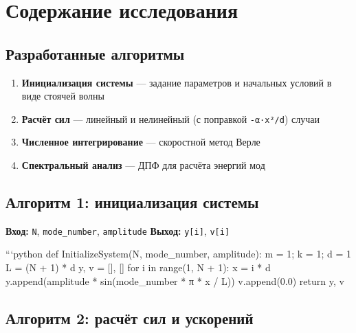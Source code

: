 \documentclass[
  12pt,
  a4paper,
  DIV=11,
  numbers=noendperiod]{scrreprt}
\providecommand{\tightlist}{%
  \setlength{\itemsep}{0pt}\setlength{\parskip}{0pt}}\usepackage{longtable,booktabs,array}
\begin{document}
\chapter{Содержание
исследования}\label{ux441ux43eux434ux435ux440ux436ux430ux43dux438ux435-ux438ux441ux441ux43bux435ux434ux43eux432ux430ux43dux438ux44f}

\section{Разработанные
алгоритмы}\label{ux440ux430ux437ux440ux430ux431ux43eux442ux430ux43dux43dux44bux435-ux430ux43bux433ux43eux440ux438ux442ux43cux44b}

\begin{enumerate}
\def\labelenumi{\arabic{enumi}.}
\tightlist
\item
  \textbf{Инициализация системы} --- задание параметров и начальных
  условий в виде стоячей волны
\item
  \textbf{Расчёт сил} --- линейный и нелинейный (с поправкой
  \texttt{-α·x²/d}) случаи
\item
  \textbf{Численное интегрирование} --- скоростной метод Верле
\item
  \textbf{Спектральный анализ} --- ДПФ для расчёта энергий мод
\end{enumerate}

\section{Алгоритм 1: инициализация
системы}\label{ux430ux43bux433ux43eux440ux438ux442ux43c-1-ux438ux43dux438ux446ux438ux430ux43bux438ux437ux430ux446ux438ux44f-ux441ux438ux441ux442ux435ux43cux44b}

\textbf{Вход:} \texttt{N}, \texttt{mode\_number}, \texttt{amplitude}
\textbf{Выход:} \texttt{y{[}i{]}}, \texttt{v{[}i{]}}

```python def InitializeSystem(N, mode\_number, amplitude): m = 1; k =
1; d = 1 L = (N + 1) * d y, v = {[}{]}, {[}{]} for i in range(1, N + 1):
x = i * d y.append(amplitude * sin(mode\_number * π * x / L))
v.append(0.0) return y, v

\section{Алгоритм 2: расчёт сил и
ускорений}\label{ux430ux43bux433ux43eux440ux438ux442ux43c-2-ux440ux430ux441ux447ux451ux442-ux441ux438ux43b-ux438-ux443ux441ux43aux43eux440ux435ux43dux438ux439}
\end{document}
